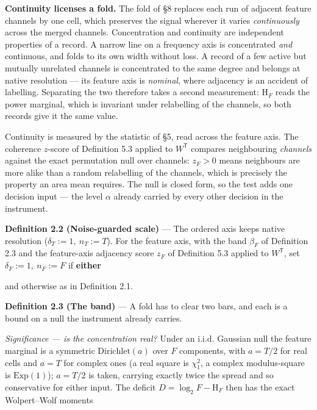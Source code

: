 \documentclass[10pt,letterpaper,twocolumn]{article}
\begin{document}
\textbf{Continuity licenses a fold.} The fold of §8 replaces each run of adjacent feature channels by one cell, which preserves the signal wherever it varies \emph{continuously} across the merged channels. Concentration and continuity are independent properties of a record. A narrow line on a frequency axis is concentrated \emph{and} continuous, and folds to its own width without loss. A record of a few active but mutually unrelated channels is concentrated to the same degree and belongs at native resolution --- its feature axis is \emph{nominal}, where adjacency is an accident of labelling. Separating the two therefore takes a second measurement: \(\mathrm{H}_F\) reads the power marginal, which is invariant under relabelling of the channels, so both records give it the same value.

Continuity is measured by the statistic of §5, read across the feature axis. The coherence \(z\)-score of Definition 5.3 applied to \(W^{\mathsf T}\) compares neighbouring \emph{channels} against the exact permutation null over channels: \(z_F>0\) means neighbours are more alike than a random relabelling of the channels, which is precisely the property an area mean requires. The null is closed form, so the test adds one decision input --- the level \(\alpha\) already carried by every other decision in the instrument.

\textbf{Definition 2.2 (Noise-guarded scale)} --- The ordered axis keeps native resolution (\(\delta_T:=1,\ n_T:=T\)). For the feature axis, with the band \(\beta_F\) of Definition 2.3 and the feature-axis adjacency score \(z_F\) of Definition 5.3 applied to \(W^{\mathsf T}\), set \(\delta_F:=1,\ n_F:=F\) if \textbf{either}


and otherwise as in Definition 2.1.

\textbf{Definition 2.3 (The band)} --- A fold has to clear two bars, and each is a bound on a null the instrument already carries.

\emph{Significance --- is the concentration real?} Under an i.i.d. Gaussian null the feature marginal is a symmetric \(\mathrm{Dirichlet}(a)\) over \(F\) components, with \(a=T/2\) for real cells and \(a=T\) for complex ones (a real square is \(\chi^2_1\), a complex modulus-square is \(\mathrm{Exp}(1)\)); \(a=T/2\) is taken, carrying exactly twice the spread and so conservative for either input. The deficit \(D=\log_2F-\mathrm H_F\) then has the exact Wolpert--Wolf moments
\end{document}

